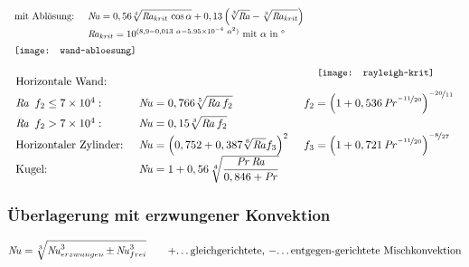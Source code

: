 	\setlength{\abovedisplayskip}{-10pt}
	\[ \arraycolsep=0.7em  \def\arraystretch{1.4}
	\begin{array}{llc}
		\text{mit Ablösung:}
			& \Nuss = 0,56 \displaystyle\sqrt[4]{\Rayl_{krit}\, \cos\alpha} + 0,13 \left( \sqrt[3]{\Rayl} - \sqrt[3]{\Rayl_{krit}} \right)
			& \multirow{8}{5cm}{\texttt{[image: rayleigh-krit]}} \\
		 & \Rayl_{krit} = 10^{(8,9 - 0,013\ \alpha - \num{5,95e-4}\ \alpha^2)} \text{ mit } \alpha \text{ in °} & \\
		 \multicolumn{2}{l}{\texttt{[image: wand-abloesung]}}
	\end{array}\]

	\setlength{\abovedisplayskip}{-15pt}
	\[ \arraycolsep=0.7em  \def\arraystretch{1.4}
	\begin{array}{lll}
		\text{Horizontale Wand:} &&\\
		 \Rayl\ f_2 \leq \num{7e4}: & \Nuss = 0,766 \displaystyle\sqrt[5]{\Rayl f_2} & f_2 = \left( 1+ 0,536 \Pran ^{\nicefrac{-11}{20}} \right) ^{\nicefrac{-20}{11}} \\
		 \Rayl\ f_2 > \num{7e4}: & \Nuss = 0,15 \displaystyle\sqrt[3]{\Rayl f_2} &\\
		 \text{Horizontaler Zylinder:} & \Nuss = \left(0,752 + 0,387 \sqrt[6]{\Rayl} f_3 \right)^2 & f_3 = \left( 1 + 0,721\Pran^{\nicefrac{-11}{20}}\right) ^{\nicefrac{-8}{27}} \\
		 \text{Kugel:} & \Nuss = 1 + 0,56\, \sqrt[4]{\dfrac{\Pran\Rayl}{0,846 + \Pran}}
	\end{array}\]

\subsubsection{Überlagerung mit erzwungener Konvektion}
	\[ \operatorname{\mathit{N\kern-.20em u}} = \sqrt[3]{\operatorname{\mathit{N\kern-.20em u}}_{erzwungen}^3 \pm \operatorname{\mathit{N\kern-.20em u}}_{frei}^3} \qquad \text{+\dots gleichgerichtete, $-$\dots entgegen-gerichtete Mischkonvektion}\]

